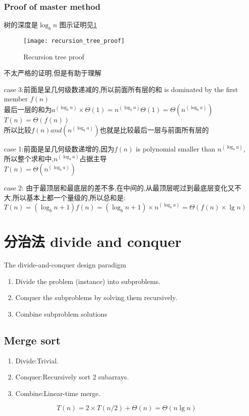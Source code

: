 \documentclass{article}
\begin{document}
\subsubsection{Proof of master method}
树的深度是$\log_b n$
图示证明见\ref{fig.compute.recursion_tree.proof}
\begin{figure}[htbp]
  \centering
  \texttt{[image: recursion\_tree\_proof]}\\
  \caption{Recursion tree proof}\label{fig.compute.recursion_tree.proof}
\end{figure}
不太严格的证明,但是有助于理解\par
case 3:前面是呈几何级数递减的,所以前面所有层的和 is dominated by the first member $f(n)$\\
最后一层的和为$a^(\log_b n) \times  \Theta(1)=n^(\log_b a) \Theta(1)= \Theta(n^(\log_b a))$\\
$T(n)=\Theta(f(n))$\\
所以比较$f(n) and (n^(\log_b a))$也就是比较最后一层与前面所有层的

case 1:前面是呈几何级数递增的,因为$f(n)$ is polynomial smaller than $n^(\log_b a)$,所以整个求和中,$n^(\log_b a)$占据主导\\
$T(n)=\Theta(n^(\log_b a))$

case 2: 由于最顶层和最底层的差不多,在中间的,从最顶层呢过到最底层变化又不大,所以基本上都一个量级的,所以总和是:\\
$T(n)=(\log_b n+1)f(n)=(\log_b n+1) \times n^(\log_b a)=\Theta(f(n) \times \lg n)$

\section{分治法 divide and conquer}
The divide-and-conquer design paradigm
\begin{enumerate}
	\item Divide the problem (instance) into subproblems.
	\item Conquer the subproblems by solving them recursively.
	\item Combine subproblem solutions
\end{enumerate}

\subsection{Merge sort}
\begin{enumerate}
	\item Divide:Trivial.
	\item Conquer:Recursively sort 2 subarrays.
	\item Combine:Linear-time merge.
\end{enumerate}
$$
T(n)=2 \times T(n/2) +\Theta(n)=\Theta(n\lg n)
$$
\end{document}
